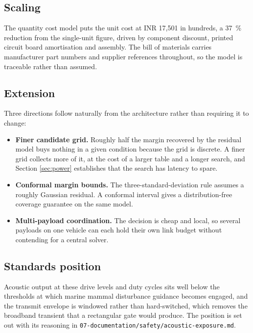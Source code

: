 \documentclass[conference,a4paper]{IEEEtran}
\begin{document}
\subsection{Scaling}

The quantity cost model puts the unit cost at INR 17{,}501 in hundreds, a
\SI{37}{\percent} reduction from the single-unit figure, driven by component
discount, printed circuit board amortisation and assembly. The bill of materials
carries manufacturer part numbers and supplier references throughout, so the
model is traceable rather than assumed.

\subsection{Extension}

Three directions follow naturally from the architecture rather than requiring
it to change:

\begin{itemize}
\item \textbf{Finer candidate grid.} Roughly half the margin recovered by the
      residual model buys nothing in a given condition because the grid is
      discrete. A finer grid collects more of it, at the cost of a larger table
      and a longer search, and Section \ref{sec:power} establishes that the
      search has latency to spare.
\item \textbf{Conformal margin bounds.} The three-standard-deviation rule
      assumes a roughly Gaussian residual. A conformal interval gives a
      distribution-free coverage guarantee on the same model.
\item \textbf{Multi-payload coordination.} The decision is cheap and local, so
      several payloads on one vehicle can each hold their own link budget
      without contending for a central solver.
\end{itemize}

\subsection{Standards position}

Acoustic output at these drive levels and duty cycles sits well below the
thresholds at which marine mammal disturbance guidance becomes engaged, and the
transmit envelope is windowed rather than hard-switched, which removes the
broadband transient that a rectangular gate would produce. The position is set
out with its reasoning in \texttt{07-documentation/safety/acoustic-exposure.md}.
\end{document}
